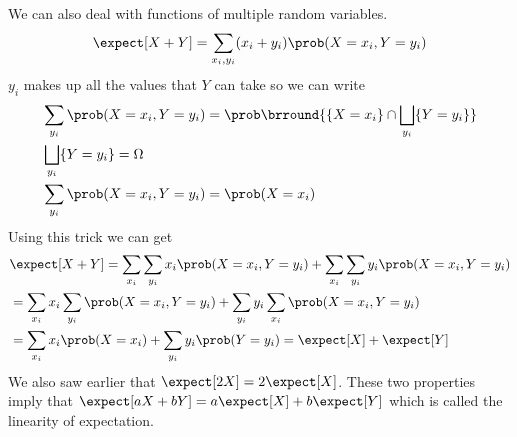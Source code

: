 We can also deal with functions of multiple random variables.\\
\[\expect[X+Y]=\sum_{x_i,y_i}(x_i+y_i)\prob(X=x_i,Y=y_i)\]
$y_i$ makes up all the values that $Y$ can take so we can write
\begin{align*}
    &\sum_{y_i}\prob(X=x_i,Y=y_i)=\prob\brround{\{X=x_i\}\cap\bigsqcup_{y_i}\{Y=y_i\}}\\
    &\bigsqcup_{y_i}\{Y=y_i\}=\Omega\\
    &\sum_{y_i}\prob(X=x_i,Y=y_i)=\prob(X=x_i)
\end{align*}
Using this trick we can get
\begin{align*}
    &\expect[X+Y]=\sum_{x_i}\sum_{y_i}x_i\prob(X=x_i,Y=y_i)+\sum_{x_i}\sum_{y_i}y_i\prob(X=x_i,Y=y_i)\\
    &=\sum_{x_i}x_i\sum_{y_i}\prob(X=x_i,Y=y_i)+\sum_{y_i}y_i\sum_{x_i}\prob(X=x_i,Y=y_i)\\
    &=\sum_{x_i}x_i\prob(X=x_i)+\sum_{y_i}y_i\prob(Y=y_i)=\expect[X]+\expect[Y]
\end{align*}
We also saw earlier that $\expect[2X]=2\expect[X]$. These two properties imply that $\expect[aX+bY]=a\expect[X]+b\expect[Y]$ which is called the linearity of expectation.\\


